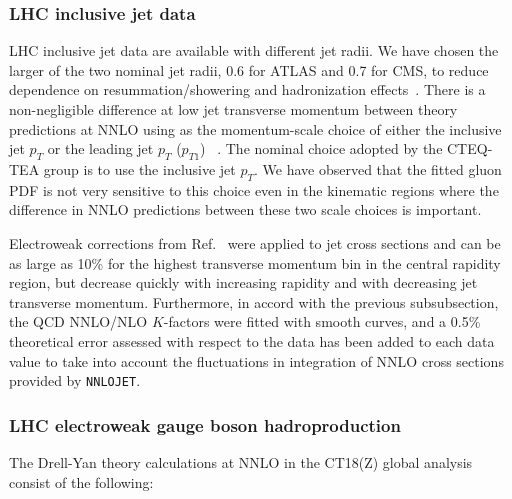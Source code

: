 \subsubsection{LHC inclusive jet data
\label{sec:TheoryJets}
}

LHC inclusive jet data are available with different jet radii. We have chosen the larger of the two nominal jet radii, 
0.6 for ATLAS and 0.7 for CMS, to reduce dependence on resummation/showering and hadronization effects~\cite{Bellm:2019yyh}. 
There is a non-negligible difference at low jet transverse momentum between theory predictions at NNLO 
using as the momentum-scale choice of either the inclusive jet $p_T$ or the leading jet $p_T$ ($p_{T1}$)~\cite{Currie:2018xkj} .
The nominal choice adopted by the CTEQ-TEA group is to use the inclusive jet $p_T$. 
We have observed that the fitted gluon PDF is not very sensitive to this choice even in the kinematic regions 
where the difference in NNLO predictions between these two scale choices is important.

Electroweak corrections from Ref.~\cite{Dittmaier:2012kx} were applied
to jet cross sections and can be as large as 10\% for the highest transverse momentum bin in the central
rapidity region, but decrease quickly with increasing rapidity and with decreasing jet transverse momentum.
Furthermore, in accord with the previous subsubsection, the QCD NNLO/NLO $K$-factors were fitted with smooth curves, and a 0.5\% theoretical error
assessed with respect to the data has been added to each data value to take into account the fluctuations
in integration of NNLO cross sections provided by \texttt{NNLOJET}.  


\subsubsection{LHC electroweak gauge boson hadroproduction
\label{sec:LHCEWbosons}}
The Drell-Yan theory calculations at NNLO in the CT18(Z) global analysis consist of the following:


